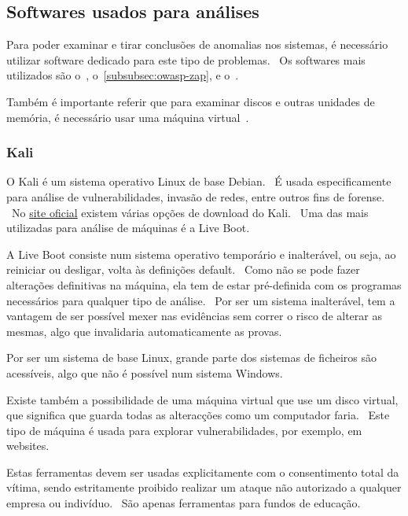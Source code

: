 \documentclass{report}
\begin{document}

\subsection{Softwares usados para análises}
\label{subsec:softwares-usados-para-analises}
Para poder examinar e tirar conclusões de anomalias nos sistemas, é necessário utilizar software dedicado para este tipo de problemas. \ Os softwares mais utilizados são o~, o~\autoref{subsubsec:owasp-zap}, e o~. \par
Também é importante referir que para examinar discos e outras unidades de memória, é necessário usar uma máquina virtual~. \par

\subsubsection{Kali}
\label{subsubsec:kali}
O Kali é um sistema operativo Linux de base Debian. \ É usada especificamente para análise de vulnerabilidades, invasão de redes, entre outros fins de forense. \  No \href{https://www.kali.org/get-kali/}{site oficial} existem várias opções de download do Kali. \ Uma das mais utilizadas para análise de máquinas é a Live Boot. \bigskip

A Live Boot consiste num sistema operativo temporário e inalterável, ou seja, ao reiniciar ou desligar, volta às definições default. \ Como não se pode fazer alterações definitivas na máquina, ela tem de estar pré-definida com os programas necessários para qualquer tipo de análise. \ Por ser um sistema inalterável, tem a vantagem de ser possível mexer nas evidências sem correr o risco de alterar as mesmas, algo que invalidaria automaticamente as provas. \par
Por ser um sistema de base Linux, grande parte dos sistemas de ficheiros são acessíveis, algo que não é possível num sistema Windows. \bigskip

Existe também a possibilidade de uma máquina virtual que use um disco virtual, que significa que guarda todas as alteracções como um computador faria. \ Este tipo de máquina é usada para explorar vulnerabilidades, por exemplo, em websites. \par
Estas ferramentas devem ser usadas explicitamente com o consentimento total da vítima, sendo estritamente proibido realizar um ataque não autorizado a qualquer empresa ou indivíduo. \ São apenas ferramentas para fundos de educação.
\end{document}
